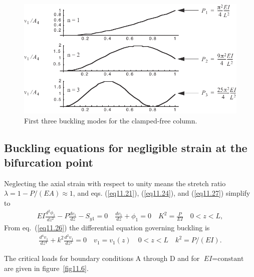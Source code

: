 \documentclass{AeroStructure-ERJohnson}
\begin{document}
\begin{figure}[!h]
\centerline{\includegraphics{Figure_11-5.pdf}}
\caption{First three buckling modes for the clamped-free column.} \label{fig11.5}
\end{figure}

\subsection{Buckling equations for negligible strain at the bifurcation point}\label{sec11.1.3}

Neglecting the axial strain with respect to unity means the stretch ratio $\lambda=1-P /(E A) \approx 1 $, and eqs. (\ref{eq11.21}), (\ref{eq11.24}), and (\ref{eq11.27}) simplify\vspace*{8pt} to\pagebreak
\begin{align}
EI \frac{d^{2} \phi_{1}}{d z^{2}}-P \frac{d v_{1}}{d z}-S_{y 1}=0 \quad \frac{d v_{1}}{d z}+\phi_{1}=0 \quad K^{2}=\frac{P}{E I} \quad 0<z<L, \label{eq11.30}
\end{align}
From eq.~(\ref{eq11.26}) the differential equation governing buckling is
\begin{align}
\frac{d^{4} v_{1}}{d z^{4}}+k^{2} \frac{d^{2} v_{1}}{d z^{2}}=0 \quad v_{1}=v_{1}(z) \quad 0<z<L \quad k^{2}=P /(E I). \label{eq11.31}
\end{align}

The critical loads for boundary conditions A through D and for $\textit{EI} = \textrm{constant}$ are given in figure~\ref{fig11.6}.
\end{document}
